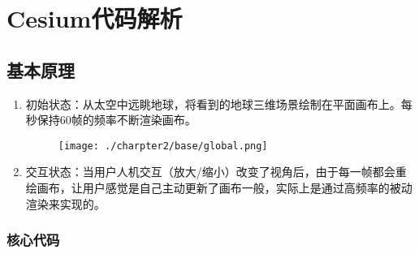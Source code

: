 \chapter{Cesium代码解析}

\section{基本原理}
\begin{enumerate}
	\item 初始状态：从太空中远眺地球，将看到的地球三维场景绘制在平面画布上。每秒保持60帧的频率不断渲染画布。
	      \begin{figure}[!htb]
		      \centering
		      \texttt{[image: ./charpter2/base/global.png]}
	      \end{figure}
	\item 交互状态：当用户人机交互（放大/缩小）改变了视角后，由于每一帧都会重绘画布，让用户感觉是自己主动更新了画布一般，实际上是通过高频率的被动渲染来实现的。
\end{enumerate}

\subsection{核心代码}

